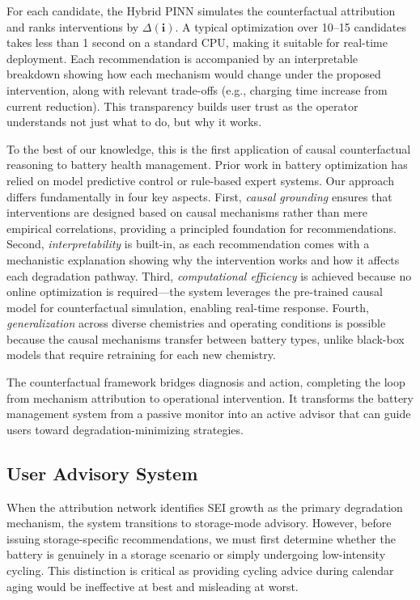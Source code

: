 \documentclass[5p,times,authoryear]{elsarticle}
\begin{document}
For each candidate, the Hybrid PINN simulates the counterfactual attribution and ranks interventions by $\Delta(\mathbf{i})$. A typical optimization over 10--15 candidates takes less than 1 second on a standard CPU, making it suitable for real-time deployment. Each recommendation is accompanied by an interpretable breakdown showing how each mechanism would change under the proposed intervention, along with relevant trade-offs (e.g., charging time increase from current reduction). This transparency builds user trust as the operator understands not just what to do, but why it works.

To the best of our knowledge, this is the first application of causal counterfactual reasoning to battery health management. Prior work in battery optimization has relied on model predictive control \citep{torchio2016lionsimba} or rule-based expert systems. Our approach differs fundamentally in four key aspects. First, \emph{causal grounding} ensures that interventions are designed based on causal mechanisms rather than mere empirical correlations, providing a principled foundation for recommendations. Second, \emph{interpretability} is built-in, as each recommendation comes with a mechanistic explanation showing why the intervention works and how it affects each degradation pathway. Third, \emph{computational efficiency} is achieved because no online optimization is required—the system leverages the pre-trained causal model for counterfactual simulation, enabling real-time response. Fourth, \emph{generalization} across diverse chemistries and operating conditions is possible because the causal mechanisms transfer between battery types, unlike black-box models that require retraining for each new chemistry.

The counterfactual framework bridges diagnosis and action, completing the loop from mechanism attribution to operational intervention. It transforms the battery management system from a passive monitor into an active advisor that can guide users toward degradation-minimizing strategies.



\subsection{User Advisory System}



When the attribution network identifies SEI growth as the primary degradation mechanism, the system transitions to storage-mode advisory. However, before issuing storage-specific recommendations, we must first determine whether the battery is genuinely in a storage scenario or simply undergoing low-intensity cycling. This distinction is critical as providing cycling advice during calendar aging would be ineffective at best and misleading at worst.
\end{document}
